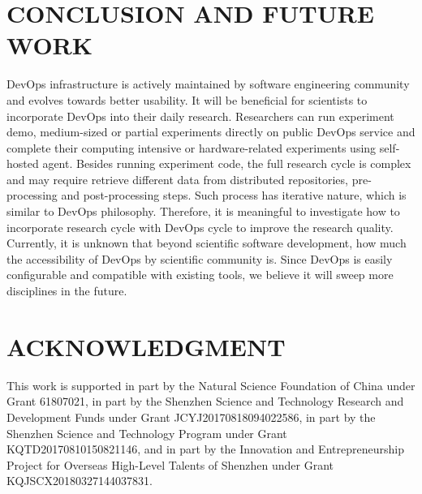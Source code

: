 \documentclass[10pt, conference, compsocconf]{IEEEtran}
\begin{document}
\section{CONCLUSION AND FUTURE WORK}
DevOps infrastructure is actively maintained by software engineering community and evolves towards better usability. It will be beneficial for scientists to incorporate DevOps into their daily research. Researchers can run experiment demo, medium-sized or partial experiments directly on public DevOps service and complete their computing intensive or hardware-related experiments using self-hosted agent. Besides running experiment code, the full research cycle is complex and may require retrieve different data from distributed repositories, pre-processing and post-processing steps. Such process has iterative nature, which is similar to DevOps philosophy. Therefore, it is meaningful to investigate how to incorporate research cycle with DevOps cycle to improve the research quality. Currently, it is unknown that beyond scientific software development, how much the accessibility of DevOps by scientific community is. Since DevOps is easily configurable and compatible with existing tools, we believe it will sweep more disciplines in the future.

\section{ACKNOWLEDGMENT}

This work is supported in part by the Natural Science Foundation of China under Grant 61807021, in part by the Shenzhen Science and Technology Research and Development Funds under Grant JCYJ20170818094022586, in part by the Shenzhen Science and Technology Program under Grant KQTD20170810150821146, and in part by the Innovation and Entrepreneurship Project for Overseas High-Level Talents of Shenzhen under Grant KQJSCX20180327144037831.



\end{document}
